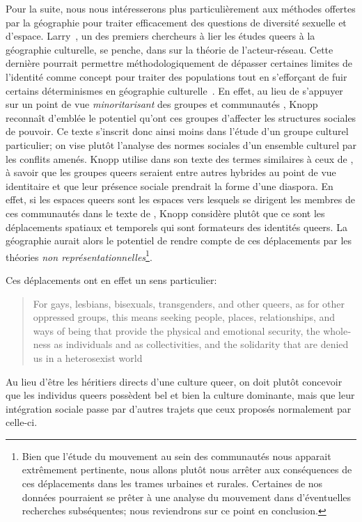 Pour la suite, nous nous intéresserons plus particulièrement aux méthodes offertes par la géographie pour traiter efficacement des questions de diversité sexuelle et d'espace.
Larry~\citet{Knopp2004}, un des premiers chercheurs à lier les études queers à la géographie culturelle, se penche, dans  sur la théorie de l'acteur-réseau.
Cette dernière pourrait permettre méthodologiquement de dépasser certaines limites de l'identité comme concept pour traiter des populations \lgbt{} tout en s’efforçant de fuir certains déterminismes en géographie culturelle~\citep{Knopp2004}.
En effet, au lieu de s'appuyer sur un point de vue \emph{minoritarisant} des groupes et communautés \lgbt{}, Knopp reconnaît d'emblée le potentiel qu'ont ces groupes d'affecter les structures sociales de pouvoir.
Ce texte s'inscrit donc ainsi moins dans l'étude d'un groupe culturel particulier; on vise plutôt l'analyse des normes sociales d'un ensemble culturel par les conflits amenés.
Knopp utilise dans son texte des termes similaires à ceux de \citet{Sinfield1996}, à savoir que les groupes queers seraient entre autres hybrides au point de vue identitaire et que leur présence sociale prendrait la forme d'une diaspora.
En effet, si les espaces queers sont les espaces vers lesquels se dirigent les membres de ces communautés dans le texte de \citet{Sinfield1996}, Knopp considère plutôt que ce sont les déplacements spatiaux et temporels qui sont formateurs des identités queers.
La géographie aurait alors le potentiel de rendre compte de ces déplacements par les théories \emph{non représentationnelles}\footnote{Bien que l'étude du mouvement au sein des communautés \lgbt{} nous apparait extrêmement pertinente, nous allons plutôt nous arrêter aux conséquences de ces déplacements dans les trames urbaines et rurales. Certaines de nos données pourraient se prêter à une analyse du mouvement dans d'éventuelles recherches subséquentes; nous reviendrons sur ce point en conclusion.}.

Ces déplacements ont en effet un sens particulier: \foreignblockquote{english}[{\cite[123]{Knopp2004}}][.]{For gays, lesbians, bisexuals, transgenders, and other queers, as for other oppressed groups, this means seeking people, places, relationships, and ways of being that provide the physical and emotional security, the wholeness as individuals and as collectivities, and the solidarity that are denied us in a heterosexist world}
Au lieu d'être les héritiers directs d'une culture queer{}, on doit plutôt concevoir que les individus queers{} possèdent bel et bien la culture dominante, mais que leur intégration sociale passe par d'autres trajets que ceux proposés normalement par celle-ci.

